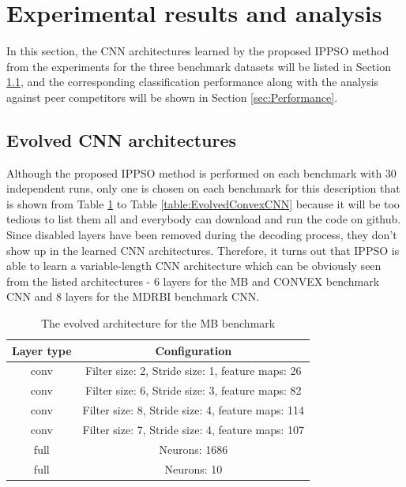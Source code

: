 \documentclass[conference]{IEEEtran}
\begin{document}
\section{Experimental results and analysis}\label{sec:EPResults}

In this section, the CNN architectures learned by the proposed IPPSO method from the experiments for the three benchmark datasets will be listed in Section \ref{sec:EvolvedCNN}, and the corresponding classification performance along with the analysis against peer competitors will be shown in Section \ref{sec:Performance}. 

\subsection{Evolved CNN architectures}\label{sec:EvolvedCNN}

Although the proposed IPPSO method is performed on each benchmark with 30 independent runs, only one is chosen on each benchmark for this description that is shown from Table \ref{table:EvolvedMBCNN} to Table \ref{table:EvolvedConvexCNN} because it will be too tedious to list them all and everybody can download and run the code on github. Since disabled layers have been removed during the decoding process, they don't show up in the learned CNN architectures. Therefore, it turns out that IPPSO is able to learn a variable-length CNN architecture which can be obviously seen from the listed architectures - 6 layers for the MB and CONVEX benchmark CNN and 8 layers for the MDRBI benchmark CNN. 

\begin{table}[!t]
	\renewcommand{\arraystretch}{1.3}
	\caption{The evolved architecture for the MB benchmark}
	\label{table:EvolvedMBCNN}
	\centering
	\begin{tabular}{|c|c|}
		\hline
		Layer type & Configuration\\
		\hline
		conv & Filter size: 2, Stride size: 1, feature maps: 26\\
		\hline
		conv & Filter size: 6, Stride size: 3, feature maps: 82\\
		\hline
		conv & Filter size: 8, Stride size: 4, feature maps: 114\\
		\hline
		conv & Filter size: 7, Stride size: 4, feature maps: 107\\
		\hline
		full & Neurons: 1686\\
		\hline
		full & Neurons: 10\\
		\hline
	\end{tabular}
\end{table}
\end{document}
